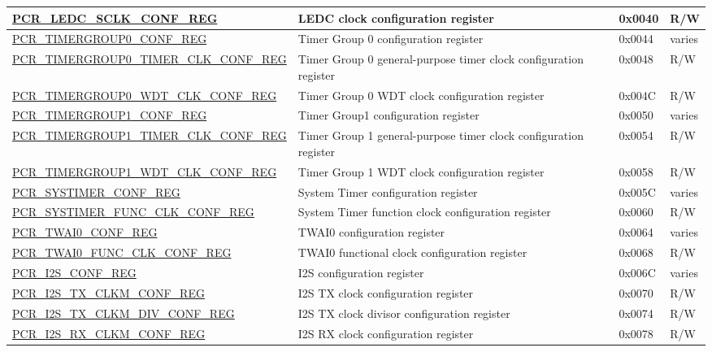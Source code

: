 \begin{longtable}{ | p{7.2cm} | p{6cm} | p{1.3cm} | p{1cm} | }
\hyperref[regdesc:PCRLEDCSCLKCONFREG]{PCR\_LEDC\_SCLK\_CONF\_REG} & LEDC clock configuration register & 0x0040 & R/W \\ \hline
\hyperref[regdesc:PCRTIMERGROUP0CONFREG]{PCR\_TIMERGROUP0\_CONF\_REG} & Timer Group 0 configuration register & 0x0044 & varies \\ \hline
\hyperref[regdesc:PCRTIMERGROUP0TIMERCLKCONFREG]{PCR\_TIMERGROUP0\_TIMER\_CLK\_CONF\_REG} & Timer Group 0 general-purpose timer clock configuration register & 0x0048 & R/W \\ \hline
\hyperref[regdesc:PCRTIMERGROUP0WDTCLKCONFREG]{PCR\_TIMERGROUP0\_WDT\_CLK\_CONF\_REG} & Timer Group 0 WDT clock configuration register & 0x004C & R/W \\ \hline
\hyperref[regdesc:PCRTIMERGROUP1CONFREG]{PCR\_TIMERGROUP1\_CONF\_REG} & Timer Group1 configuration register & 0x0050 & varies \\ \hline
\hyperref[regdesc:PCRTIMERGROUP1TIMERCLKCONFREG]{PCR\_TIMERGROUP1\_TIMER\_CLK\_CONF\_REG} & Timer Group 1 general-purpose timer clock configuration register & 0x0054 & R/W \\ \hline
\hyperref[regdesc:PCRTIMERGROUP1WDTCLKCONFREG]{PCR\_TIMERGROUP1\_WDT\_CLK\_CONF\_REG} & Timer Group 1 WDT clock configuration register & 0x0058 & R/W \\ \hline
\hyperref[regdesc:PCRSYSTIMERCONFREG]{PCR\_SYSTIMER\_CONF\_REG} & System Timer configuration register & 0x005C & varies \\ \hline
\hyperref[regdesc:PCRSYSTIMERFUNCCLKCONFREG]{PCR\_SYSTIMER\_FUNC\_CLK\_CONF\_REG} & System Timer function clock configuration register & 0x0060 & R/W \\ \hline
\hyperref[regdesc:PCRTWAI0CONFREG]{PCR\_TWAI0\_CONF\_REG} & TWAI0 configuration register & 0x0064 & varies \\ \hline
\hyperref[regdesc:PCRTWAI0FUNCCLKCONFREG]{PCR\_TWAI0\_FUNC\_CLK\_CONF\_REG} & TWAI0 functional clock configuration register & 0x0068 & R/W \\ \hline
\hyperref[regdesc:PCRI2SCONFREG]{PCR\_I2S\_CONF\_REG} & I2S configuration register & 0x006C & varies \\ \hline
\hyperref[regdesc:PCRI2STXCLKMCONFREG]{PCR\_I2S\_TX\_CLKM\_CONF\_REG} & I2S TX clock configuration register & 0x0070 & R/W \\ \hline
\hyperref[regdesc:PCRI2STXCLKMDIVCONFREG]{PCR\_I2S\_TX\_CLKM\_DIV\_CONF\_REG} & I2S TX clock divisor configuration register & 0x0074 & R/W \\ \hline
\hyperref[regdesc:PCRI2SRXCLKMCONFREG]{PCR\_I2S\_RX\_CLKM\_CONF\_REG} & I2S RX clock configuration register & 0x0078 & R/W \\ \hline

\end{longtable}
